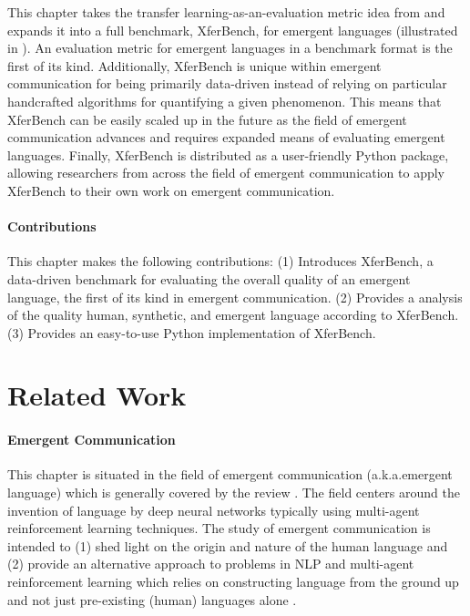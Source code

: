 This chapter takes the transfer learning-as-an-evaluation metric idea from \citet{yao2022linking} and expands it into a full benchmark, XferBench, for emergent languages (illustrated in ).
An evaluation metric for emergent languages in a benchmark format is the first of its kind.
Additionally, XferBench is unique within emergent communication for being primarily data-driven instead of relying on particular handcrafted algorithms for quantifying a given phenomenon.
This means that XferBench can be easily scaled up in the future as the field of emergent communication advances and requires expanded means of evaluating emergent languages.
Finally, XferBench is distributed as a user-friendly Python package, allowing researchers from across the field of emergent communication to apply XferBench to their own work on emergent communication.



\paragraph{Contributions}
This chapter makes the following contributions:
(1) Introduces XferBench, a data-driven benchmark for evaluating the overall quality of an emergent language, the first of its kind in emergent communication.
(2) Provides a analysis of the quality human, synthetic, and emergent language according to XferBench.
(3) Provides an easy-to-use Python implementation of XferBench.

\section{Related Work}


\paragraph{Emergent Communication}
This chapter is situated in the field of emergent communication (a.k.a.\@ emergent language) which is generally covered by the review \citet{Lazaridou2020EmergentMC}.
The field centers around the invention of language by deep neural networks typically using multi-agent reinforcement learning techniques.
The study of emergent communication is intended to (1) shed light on the origin and nature of the human language \citep{lacroix2019biology,MoulinFrier2020MultiAgentRL,Galke2022EmergentCF} and (2) provide an alternative approach to problems in NLP and multi-agent reinforcement learning which relies on constructing language from the ground up and not just pre-existing (human) languages alone \citep{li-etal-2020-emergent,yao2022linking,mu2023ec2,downey-etal-2023-learning}.


